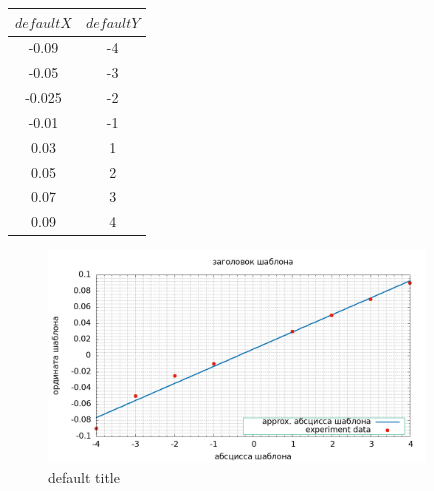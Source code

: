 \documentclass[a4paper]{article}
\begin{document}
    \begin{center}
        \begin{tabular}{|c|c|}
            \hline
            $ defaultX $ & $ defaultY $ \\
            \hline
            -0.09 & -4 \\
            -0.05 & -3 \\
            -0.025 & -2 \\
            -0.01 & -1 \\
            0.03 & 1 \\
            0.05 & 2 \\
            0.07 & 3 \\
            0.09 & 4 \\
            \hline
        \end{tabular}
    \end{center}

    \begin{figure}[ht!]
    \centering
    \includegraphics[width=100mm]{result.png}
    
    \caption{default title \label{overflow}}
    \end{figure}
\end{document}
